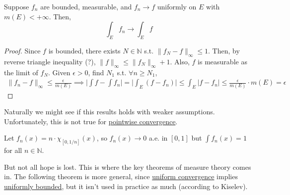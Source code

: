   \begin{theorem}
    \label{thm:uniform-convergence-implies-convergence-of}
    Suppose $f_n$ are bounded, measurable, and $f_n \to f$ uniformly on $E$ with $m(E) < +\infty$. Then, 
    \begin{equation}
      \int_E f_n \to \int_E f
    \end{equation}
  \end{theorem} 
  \begin{proof} 
    Since $f$ is bounded, there exists $N \in \mathbb{N}$ s.t. $\| f_N - f \|_{\infty} \leq 1$. Then, by reverse triangle inequality (?), $\|f\|_\infty \leq \|f_N\|_\infty + 1$. Also, $f$ is measurable as the limit of $f_N$. Given $\epsilon > 0$, find $N_1$ s.t. $\forall n \geq N_1$, 
    \begin{align}
      \|f_n - f\|_\infty \leq \frac{\epsilon}{m(E)} \implies  \bigg| \int f - \int f_n \bigg| = \bigg| \int_E (f - f_n) \bigg| \leq \int_E |f - f_n| \leq \frac{\epsilon}{m(E)} \cdot m(E) = \epsilon
    \end{align}
  \end{proof}

  Naturally we might see if this results holds with weaker assumptions. Unfortunately, this is not true for \hyperref[real-def:pointwise-convergence]{pointwise convergence}. 

  \begin{example}
    \label{ex:integrals-dont-converge-under-pointwise}
    Let $f_n (x) = n \cdot \chi_{[0, 1/n]} (x)$, so $f_n (x) \to 0$ a.e. in $[0, 1]$ but $\int f_n (x) = 1$ for all $n \in \mathbb{N}$. 
  \end{example}

  But not all hope is lost. This is where the key theorems of measure theory comes in. The following theorem is more general, since \hyperref[real-def:uniform-convergence]{uniform convergence} implies \hyperref[real-def:uniformly-bounded]{uniformly bounded}, but it isn't used in practice as much (according to Kiselev). 

